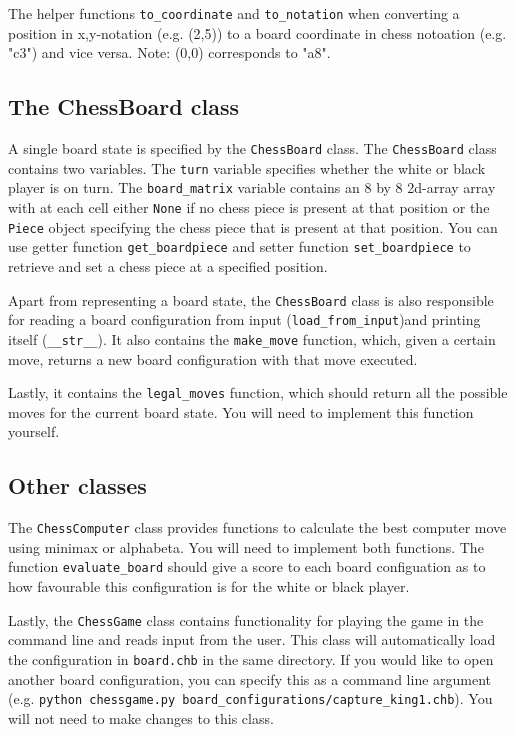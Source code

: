 The helper functions \texttt{to\_coordinate} and \texttt{to\_notation} when converting a position in x,y-notation (e.g. (2,5)) to a board coordinate in chess notoation (e.g. "c3") and vice versa. Note: (0,0) corresponds to "a8".

\subsection*{The ChessBoard class}
A single board state is specified by the \texttt{ChessBoard} class. The \texttt{ChessBoard} class contains two variables. The \texttt{turn} variable specifies whether the white or black player is on turn. The \texttt{board\_matrix} variable contains an 8 by 8 2d-array array with at each cell either \texttt{None} if no chess piece is present at that position or the \texttt{Piece} object specifying the chess piece that is present at that position. You can use getter function \texttt{get\_boardpiece} and setter function \texttt{set\_boardpiece} to retrieve and set a chess piece at a specified position.

Apart from representing a board state, the \texttt{ChessBoard} class is also responsible for reading a board configuration from input (\texttt{load\_from\_input})and printing itself (\texttt{\_\_str\_\_}). It also contains the \texttt{make\_move} function, which, given a certain move, returns a new board configuration with that move executed. 

Lastly, it contains the \texttt{legal\_moves} function, which should return all the possible moves for the current board state. You will need to implement this function yourself.

\subsection*{Other classes}
The \texttt{ChessComputer} class provides functions to calculate the best computer move using minimax or alphabeta. You will need to implement both functions. The function \texttt{evaluate\_board} should give a score to each board configuation as to how favourable this configuration is for the white or black player.

Lastly, the \texttt{ChessGame} class contains functionality for playing the game in the command line and reads input from the user. This class will automatically load the configuration in \texttt{board.chb} in the same directory. If you would like to open another board configuration, you can specify this as a command line argument (e.g. \texttt{python chessgame.py board\_configurations/capture\_king1.chb}). You will not need to make changes to this class.


